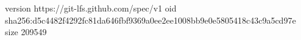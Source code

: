 version https://git-lfs.github.com/spec/v1
oid sha256:d5c4482f4292fc81da646fbf9369a0ee2ee1008bb9e0e5805418c43c9a5cd97e
size 209549
